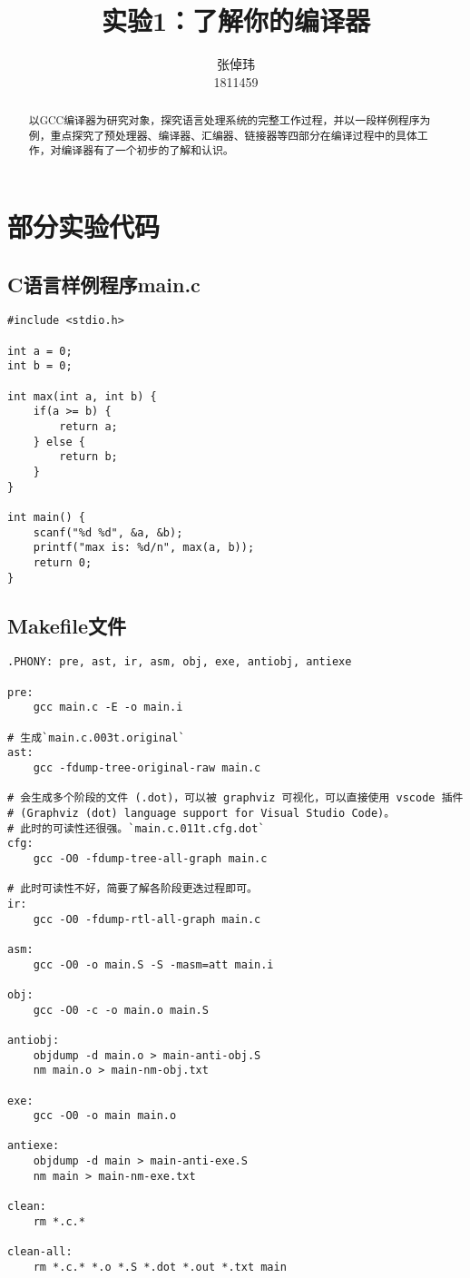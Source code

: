 \documentclass[lang=cn,11pt,a4paper,cite=authoryear]{elegantpaper}
\title{实验1：了解你的编译器}
\author{张倬玮 \\ 1811459}
\date{\zhtoday}
\begin{document}
\maketitle

\begin{abstract}
以GCC编译器为研究对象，探究语言处理系统的完整工作过程，并以一段样例程序为例，重点探究了预处理器、编译器、汇编器、链接器等四部分在编译过程中的具体工作，对编译器有了一个初步的了解和认识。
\end{abstract}

\section{部分实验代码}

\subsection{C语言样例程序main.c}

\begin{lstlisting}
#include <stdio.h>

int a = 0;
int b = 0;

int max(int a, int b) {
    if(a >= b) {
        return a;
    } else {
        return b;
    }
}

int main() {
    scanf("%d %d", &a, &b);
    printf("max is: %d/n", max(a, b));
    return 0;
}
\end{lstlisting}

\subsection{Makefile文件}
\begin{lstlisting}
.PHONY: pre, ast, ir, asm, obj, exe, antiobj, antiexe

pre:
	gcc main.c -E -o main.i

# 生成`main.c.003t.original` 
ast:
	gcc -fdump-tree-original-raw main.c

# 会生成多个阶段的文件 (.dot)，可以被 graphviz 可视化，可以直接使用 vscode 插件 
# (Graphviz (dot) language support for Visual Studio Code)。
# 此时的可读性还很强。`main.c.011t.cfg.dot` 
cfg:
	gcc -O0 -fdump-tree-all-graph main.c

# 此时可读性不好，简要了解各阶段更迭过程即可。 
ir:
	gcc -O0 -fdump-rtl-all-graph main.c

asm:
	gcc -O0 -o main.S -S -masm=att main.i

obj:
	gcc -O0 -c -o main.o main.S

antiobj:
	objdump -d main.o > main-anti-obj.S 
	nm main.o > main-nm-obj.txt

exe:
	gcc -O0 -o main main.o

antiexe:
	objdump -d main > main-anti-exe.S 
	nm main > main-nm-exe.txt

clean:
	rm *.c.*

clean-all:
	rm *.c.* *.o *.S *.dot *.out *.txt main
\end{lstlisting}
\end{document}
